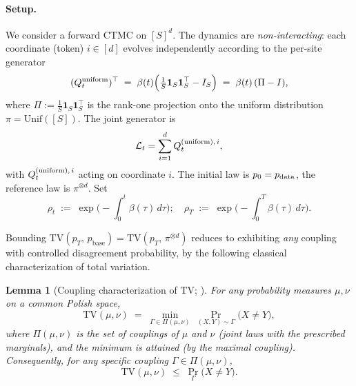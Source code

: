\documentclass{article} %
\newtheorem{lemma}[theorem]{Lemma}
\newcommand{\TV}{\mathrm{TV}}
\newcommand{\pbase}{p_\mathrm{base}}
\newcommand{\Punif}{\Pi}
\begin{document}
\paragraph{Setup.}
We consider a forward CTMC on $[S]^d$. The dynamics are
\emph{non-interacting}: each coordinate (token) $i \in [d]$ evolves
independently according to the per-site generator
\begin{equation}\label{eq:Q_uni_appendix}
  (Q_t^{\rm uniform})^\top
  \;=\; \beta(t)\Big(\tfrac{1}{S}\mathbf{1}_S \mathbf{1}_S^\top - I_S\Big)
  \;=\; \beta(t)\,(\Punif - I),
\end{equation}
where $\Punif := \tfrac{1}{S}\mathbf{1}_S\mathbf{1}_S^\top$ is the rank-one
projection onto the uniform distribution $\pi = \mathrm{Unif}([S])$.
The joint generator is
\begin{equation}\label{eq:joint_generator}
\mathcal{L}_t = \sum_{i=1}^d Q_t^{({\rm uniform}),\,i},
\end{equation}
with
$Q_t^{({\rm uniform}),\,i}$ acting on coordinate $i$. The initial law
is $p_0 = p_{\rm data}$, the reference law is $\pi^{\otimes d}$. Set
\begin{equation}\label{eq:rhoT}
  \rho_t \;:=\; \exp\!\Big(-\!\int_0^t \beta(\tau)\,d\tau\Big); \quad \rho_T \;:=\; \exp\!\Big(-\!\int_0^T \beta(\tau)\,d\tau\Big).
\end{equation}

Bounding $\TV(p_T,\, \pbase)=\TV(p_T,\, \pi^{\otimes d})$ reduces to exhibiting
\emph{any} coupling with controlled disagreement probability, by the
following classical characterization of total variation.
\begin{lemma}[{Coupling characterization of $\TV$; \citep[Proposition~4.7]{levin2017markov}}]
\label{lem:coupling}
For any probability measures $\mu, \nu$ on a common Polish space,
\[
  \TV(\mu, \nu) \;=\; \min_{\Gamma \in \Pi(\mu, \nu)}\,
                       \Pr_{(X, Y) \sim \Gamma}\!\big(X \neq Y\big),
\]
where $\Pi(\mu, \nu)$ is the set of couplings of $\mu$ and $\nu$ (joint
laws with the prescribed marginals), and the minimum is attained (by
the maximal coupling). Consequently, for any \emph{specific} coupling
$\Gamma \in \Pi(\mu, \nu)$,
\begin{equation}\label{eq:coupling}
  \TV(\mu, \nu) \;\le\; \Pr_\Gamma\!\big(X \neq Y\big).
\end{equation}
\end{lemma}
\end{document}
